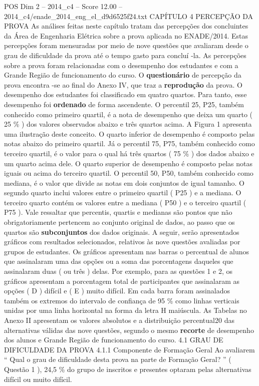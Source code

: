 \begin{textsample}{POS Dim 2 – 2014\_c4 – Score 12.00 – 2014\_c4/enade\_2014\_eng\_el\_d9d6525f24.txt}  \label{ex:f2_pos_116}
CAPÍTULO 4 PERCEPÇÃO DA PROVA As análises feitas neste capítulo tratam das percepções dos concluintes da Área de Engenharia Elétrica sobre a prova aplicada no ENADE/2014.
Estas percepções foram mensuradas por meio de nove questões que avaliaram desde o grau de dificuldade da prova até o tempo gasto para concluí -la.
As percepções sobre a prova foram relacionadas com o desempenho dos estudantes e com a Grande Região de funcionamento do curso.
O \textbf{questionário} de percepção da prova encontra -se ao final do Anexo IV, que traz a \textbf{reprodução} da prova.
O desempenho dos estudantes foi classificado em quatro quartos.
Para tanto, esse desempenho foi \textbf{ordenado} de forma ascendente.
O percentil 25, P25, também conhecido como primeiro quartil, é a nota de desempenho que deixa um quarto ( 25 \% ) dos valores observados abaixo e três quartos acima.
A Figura 1 apresenta uma ilustração deste conceito.
O quarto inferior de desempenho é composto pelas notas abaixo do primeiro quartil.
Já o percentil 75, P75, também conhecido como terceiro quartil, é o valor para o qual há três quartos ( 75 \% ) dos dados abaixo e um quarto acima dele.
O quarto superior de desempenho é composto pelas notas iguais ou acima do terceiro quartil.
O percentil 50, P50, também conhecido como mediana, é o valor que divide as notas em dois conjuntos de igual tamanho.
O segundo quarto inclui valores entre o primeiro quartil ( P25 ) e a mediana.
O terceiro quarto contém os valores entre a mediana ( P50 ) e o terceiro quartil ( P75 ).
Vale ressaltar que percentis, quartis e medianas são pontos que não obrigatoriamente pertencem ao conjunto original de dados, ao passo que os quartos são \textbf{subconjuntos} dos dados originais.
A seguir, serão apresentados gráficos com resultados selecionados, relativos às nove questões avaliadas por grupos de estudantes.
Os gráficos apresentam nas barras o percentual de alunos que assinalaram uma das opções ou a soma das porcentagens daqueles que assinalaram duas ( ou três ) delas.
Por exemplo, para as questões 1 e 2, os gráficos apresentam a porcentagem total de participantes que assinalaram as opções ( D ) difícil e ( E ) muito difícil.
Em cada barra foram assinalados também os extremos do intervalo de confiança de 95 \% como linhas verticais unidas por uma linha horizontal na forma da letra H maiúscula.
As Tabelas no Anexo II apresentam os valores absolutos e a distribuição percentual20 das alternativas válidas das nove questões, segundo o mesmo \textbf{recorte} de desempenho dos alunos e Grande Região de funcionamento do curso. 4.1 GRAU DE DIFICULDADE DA PROVA 4.1.1 Componente de Formação Geral Ao avaliarem “ Qual o grau de dificuldade desta prova na parte de Formação Geral? ” ( Questão 1 ), 24,5 \% do grupo de inscritos e presentes optaram pelas alternativas difícil ou muito difícil.

\end{textsample}
